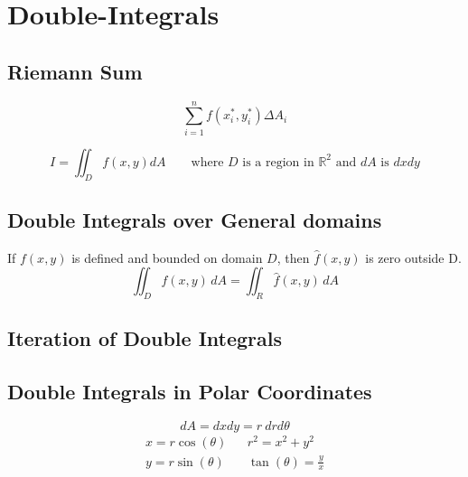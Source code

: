 \section{Double-Integrals}
\subsection{Riemann Sum}
$$\sum_{i=1}^n f(x_i^*, y_i^*) \Delta A_i$$

\[
  I=\iint_D f(x,y) dA\quad \quad \text{where } D \text{ is a region in } \mathbb{R}^2 \text{ and } dA \text{ is }dxdy
\]

\subsection{Double Integrals over General domains}
If $f(x,y)$ is defined and bounded on domain $D$, then $\hat{f}(x,y)$ is zero outside D.\\
$$\iint_{D}f(x,y)\,d A=\iint_{R}{\hat{f}}(x,y)\,d A$$

\subsection{Iteration of Double Integrals}


\subsection{Double Integrals in Polar Coordinates}
$$dA=dxdy = r\ dr d\theta$$
$$\begin{array}{lll}
  x=r\cos(\theta)&&r^2=x^2+y^2\\
  y=r\sin(\theta)&&\tan(\theta)=\frac{y}{x}
\end{array}$$


